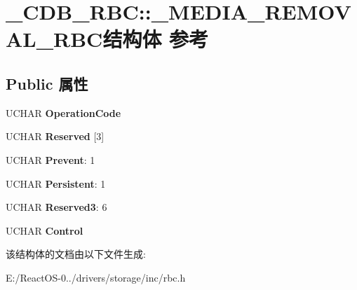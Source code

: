 \hypertarget{struct___c_d_b___r_b_c_1_1___m_e_d_i_a___r_e_m_o_v_a_l___r_b_c}{}\section{\+\_\+\+C\+D\+B\+\_\+\+R\+BC\+:\+:\+\_\+\+M\+E\+D\+I\+A\+\_\+\+R\+E\+M\+O\+V\+A\+L\+\_\+\+R\+B\+C结构体 参考}
\label{struct___c_d_b___r_b_c_1_1___m_e_d_i_a___r_e_m_o_v_a_l___r_b_c}
\subsection*{Public 属性}
\begin{DoxyCompactItemize}
\item 
\mbox{\label{struct___c_d_b___r_b_c_1_1___m_e_d_i_a___r_e_m_o_v_a_l___r_b_c_a04b3de1c138afd3bcfb105f6a0abf3f4}} 
U\+C\+H\+AR {\bfseries Operation\+Code}
\item 
\mbox{\label{struct___c_d_b___r_b_c_1_1___m_e_d_i_a___r_e_m_o_v_a_l___r_b_c_ad6da7ea5a4604417f2bde891183800cb}} 
U\+C\+H\+AR {\bfseries Reserved} \mbox{[}3\mbox{]}
\item 
\mbox{\label{struct___c_d_b___r_b_c_1_1___m_e_d_i_a___r_e_m_o_v_a_l___r_b_c_a28848c57887920aa8b72c0ebab323ded}} 
U\+C\+H\+AR {\bfseries Prevent}\+: 1
\item 
\mbox{\label{struct___c_d_b___r_b_c_1_1___m_e_d_i_a___r_e_m_o_v_a_l___r_b_c_a7034e403cb91da02c00fd59ecee06c9e}} 
U\+C\+H\+AR {\bfseries Persistent}\+: 1
\item 
\mbox{\label{struct___c_d_b___r_b_c_1_1___m_e_d_i_a___r_e_m_o_v_a_l___r_b_c_a516de00865a7092981bec83dfcf4cd0a}} 
U\+C\+H\+AR {\bfseries Reserved3}\+: 6
\item 
\mbox{\label{struct___c_d_b___r_b_c_1_1___m_e_d_i_a___r_e_m_o_v_a_l___r_b_c_abefa68641de8b2bf69805447ad3804f4}} 
U\+C\+H\+AR {\bfseries Control}
\end{DoxyCompactItemize}


该结构体的文档由以下文件生成\+:\begin{DoxyCompactItemize}
\item 
E\+:/\+React\+O\+S-\/0../drivers/storage/inc/rbc.\+h\end{DoxyCompactItemize}
